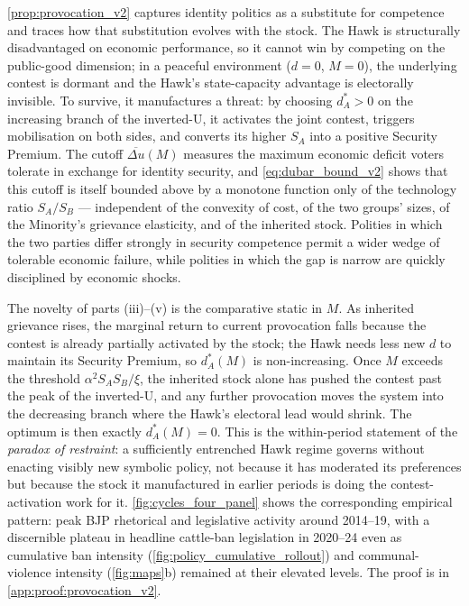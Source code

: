 \documentclass[11pt,twoside]{extarticle}
\begin{document}
\autoref{prop:provocation_v2} captures identity politics as a substitute for competence and traces how that substitution evolves with the stock. The Hawk is structurally disadvantaged on economic performance, so it cannot win by competing on the public-good dimension; in a peaceful environment ($d=0$, $M=0$), the underlying contest is dormant and the Hawk's state-capacity advantage is electorally invisible. To survive, it manufactures a threat: by choosing $d_A^*>0$ on the increasing branch of the inverted-U, it activates the joint contest, triggers mobilisation on both sides, and converts its higher $S_A$ into a positive Security Premium. The cutoff $\overline{\Delta u}(M)$ measures the maximum economic deficit voters tolerate in exchange for identity security, and \autoref{eq:dubar_bound_v2} shows that this cutoff is itself bounded above by a monotone function only of the technology ratio $S_A/S_B$ — independent of the convexity of cost, of the two groups' sizes, of the Minority's grievance elasticity, and of the inherited stock. Polities in which the two parties differ strongly in security competence permit a wider wedge of tolerable economic failure, while polities in which the gap is narrow are quickly disciplined by economic shocks.

The novelty of parts (iii)--(v) is the comparative static in $M$. As inherited grievance rises, the marginal return to current provocation falls because the contest is already partially activated by the stock; the Hawk needs less new $d$ to maintain its Security Premium, so $d_A^*(M)$ is non-increasing. Once $M$ exceeds the threshold $\alpha^2 S_A S_B/\xi$, the inherited stock alone has pushed the contest past the peak of the inverted-U, and any further provocation moves the system into the decreasing branch where the Hawk's electoral lead would shrink. The optimum is then exactly $d_A^*(M)=0$. This is the within-period statement of the \emph{paradox of restraint}: a sufficiently entrenched Hawk regime governs without enacting visibly new symbolic policy, not because it has moderated its preferences but because the stock it manufactured in earlier periods is doing the contest-activation work for it. \autoref{fig:cycles_four_panel} shows the corresponding empirical pattern: peak BJP rhetorical and legislative activity around 2014--19, with a discernible plateau in headline cattle-ban legislation in 2020--24 even as cumulative ban intensity (\autoref{fig:policy_cumulative_rollout}) and communal-violence intensity (\autoref{fig:maps}b) remained at their elevated levels. The proof is in \autoref{app:proof:provocation_v2}.
\end{document}
